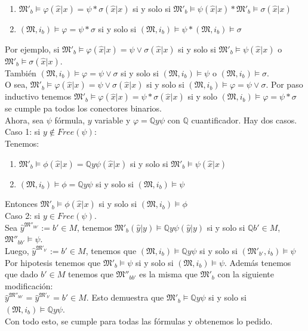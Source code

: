 \begin{sol}
\begin{enumerate}
        \item $\mathfrak{M}'_b \models \varphi (\hat{x}|x) =  \psi * \sigma (\hat{x}|x)$ si y solo si $\mathfrak{M}'_b \models \psi(\hat{x}|x) * \mathfrak{M}'_b \models \sigma (\hat{x}|x)$
        \item $(\mathfrak{M},i_b) \models \varphi = \psi * \sigma$ si y solo si $(\mathfrak{M},i_b) \models \psi *(\mathfrak{M},i_b) \models \sigma$
    \end{enumerate}
    Por ejemplo, si $\mathfrak{M}'_b \models \varphi (\hat{x}|x) =  \psi \vee \sigma (\hat{x}|x)$ si y solo si $\mathfrak{M}'_b \models \psi(\hat{x}|x)$ o $\mathfrak{M}'_b \models \sigma (\hat{x}|x)$.\\
    También $(\mathfrak{M},i_b) \models \varphi = \psi \vee \sigma$ si y solo si $(\mathfrak{M},i_b) \models \psi$ o $(\mathfrak{M},i_b) \models \sigma$.\\
    O sea, $\mathfrak{M}'_b \models \varphi (\hat{x}|x) =  \psi \vee \sigma (\hat{x}|x)$ si y solo si $(\mathfrak{M},i_b) \models \varphi = \psi \vee \sigma$.
    Por paso inductivo tenemos $\mathfrak{M}'_b \models \varphi (\hat{x}|x) =  \psi * \sigma (\hat{x}|x)$ si y solo $(\mathfrak{M},i_b) \models \varphi = \psi * \sigma$ se cumple pa todos los conectores binarios.\\
    Ahora, sea $\psi$ fórmula, $y$ variable y $\varphi = \mathbb{Q}y\psi$ con $\mathbb{Q}$ cuantificador. Hay dos casos. Caso 1: si $y \notin Free(\psi)$:\\
    Tenemos: \begin{enumerate}
        \item $\mathfrak{M}'_b \models \phi(\hat{x}|x) = \mathbb{Q}y\psi (\hat{x}|x)$ si y solo si $\mathfrak{M}'_b \models \psi(\hat{x}|x)$
        \item $(\mathfrak{M},i_b) \models \phi = \mathbb{Q}y\psi$ si y solo si $(\mathfrak{M},i_b) \models \psi$
    \end{enumerate}
    Entonces $\mathfrak{M}'_b \models \phi(\hat{x}|x)$ si y solo si $(\mathfrak{M},i_b) \models \phi$\\
    Caso 2: si $y \in Free(\psi)$. \\
    Sea $\hat{y}^{\mathfrak{M}''_{bb'}}:=b' \in M$, tenemos $\mathfrak{M}'_b(\hat{y}|y) \models \mathbb{Q}y\psi(\hat{y}|y)$ si y solo si $\mathbb{Q}b' \in M$, $\mathfrak{M}''_{bb'} \models \psi$.\\
    Luego, $\hat{y}^{\mathfrak{M}'_{b'}}:=b' \in M$, tenemos que $(\mathfrak{M},i_b) \models \mathbb{Q}y\psi$ si y solo si $(\mathfrak{M}'_{b'},i_b) \models \psi$\\
    Por hipotesis tenemos que $\mathfrak{M}'_b \models \psi$ si y solo si $(\mathfrak{M},i_b) \models \psi$. Además tenemos que dado $b' \in M$ tenemos que $\mathfrak{M}''_{bb'}$ es la misma que $\mathfrak{M}'_b$ con la siguiente modificación:\\
    $\hat{y}^{\mathfrak{M}''_{bb'}} = \hat{y}^{\mathfrak{M}'_{b'}} = b' \in M$. Esto demuestra que $\mathfrak{M}'_b \models \mathbb{Q}y\psi$ si y solo si $(\mathfrak{M},i_b) \models \mathbb{Q}y\psi$.\\
    Con todo esto, se cumple para todas las fórmulas y obtenemos lo pedido.


\end{sol}
